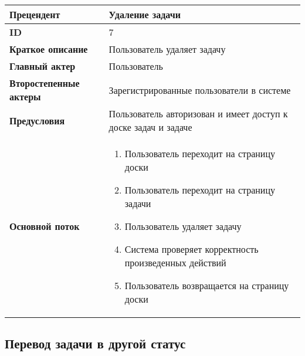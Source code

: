 \documentclass[14pt,a4paper]{extarticle}
\begin{document}
\begin{tabular}{|l|p{9cm}|}
	\hline
	\textbf{Прецендент}            & Удаление задачи                                                \\
	\hline
	\textbf{ID}                    & 7                                                              \\
	\hline
	\textbf{Краткое описание}      & Пользователь удаляет задачу                                    \\
	\hline
	\textbf{Главный актер}         & Пользователь                                                   \\
	\hline
	\textbf{Второстепенные актеры} & Зарегистрированные пользователи в системе                      \\
	\hline
	\textbf{Предусловия}           & Пользователь авторизован и имеет доступ к доске задач и задаче \\
	\hline
	\textbf{Основной поток}        & \begin{enumerate}
		                                 \item Пользователь переходит на страницу доски
		                                 \item Пользователь переходит на страницу задачи
		                                 \item Пользователь удаляет задачу
		                                 \item Система проверяет корректность произведенных действий
		                                 \item Пользователь возвращается на страницу доски
	                                 \end{enumerate}     \\
	\hline
\end{tabular}

\subsection{Перевод задачи в другой статус}
\end{document}
